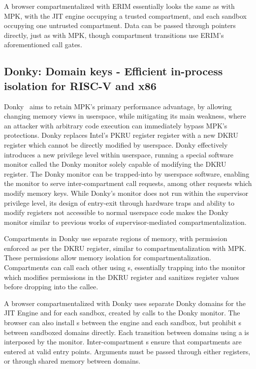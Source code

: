 A browser compartmentalized with ERIM essentially looks the same as with
MPK, with the JIT engine occupying a trusted compartment, and each sandbox
occupying one untrusted compartment. 
Data can be passed through pointers directly, just as with MPK, though 
compartment transitions use ERIM's aforementioned call gates.

\subsection{Donky: Domain keys - Efficient in-process isolation for RISC-V and x86}
Donky~\cite{SchrammelWSS0MG20Donky} aims to retain MPK's primary 
performance advantage, by allowing changing memory views in userspace, 
while mitigating its main weakness, 
where an attacker with arbitrary code execution can immediately bypass
MPK's protections.
Donky replaces Intel's PKRU register register with a new DKRU register
which cannot be directly modified by userspace.
Donky effectively introduces a new privilege level within userspace, 
running a special software monitor called the Donky monitor solely 
capable of modifying the DKRU register.
The Donky monitor can be trapped-into by userspace software, enabling the
monitor to serve inter-compartment call requests, among other requests
which modify memory keys.
While Donky's monitor does not run within the supervisor privilege level,
its design of entry-exit through hardware traps and ability to modify
registers not accessible to normal userspace code makes the Donky monitor
similar to previous works of supervisor-mediated compartmentalization.

Compartments in Donky use separate regions of memory, with permission
enforced as per the DKRU register, similar to compartmentalization with
MPK.
These permissions allow memory isolation for compartmentalization.
Compartments can call each other using s, essentially trapping
into the monitor which modifies permissions in the DKRU register and
sanitizes register values before dropping into the callee.

A browser compartmentalized with Donky uses separate Donky domains for the 
JIT Engine and for each sandbox, created by calls to the Donky monitor.
The browser can also install s between the engine and each
sandbox, but prohibit s between sandboxed domains directly.
Each transition between domains using a  is interposed by the
monitor.
Inter-compartment s ensure that compartments are entered at
valid entry points.
Arguments must be passed through either registers, or through shared memory
between domains.

